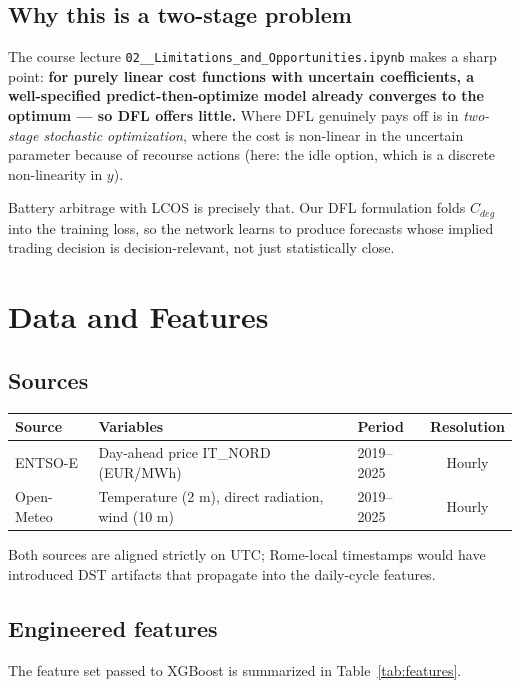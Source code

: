 \documentclass[11pt,a4paper]{article}
\newcommand{\code}[1]{\allowbreak\texttt{\small #1}\allowbreak}
\begin{document}
\subsection{Why this is a two-stage problem}
The course lecture \code{02\_\_Limitations\_and\_Opportunities.ipynb}
makes a sharp point: \textbf{for purely linear cost functions with
uncertain coefficients, a well-specified predict-then-optimize model
already converges to the optimum --- so DFL offers little.} Where DFL
genuinely pays off is in \emph{two-stage stochastic optimization}, where
the cost is non-linear in the uncertain parameter because of recourse
actions (here: the idle option, which is a discrete non-linearity in
$y$).

Battery arbitrage with LCOS is precisely that. Our DFL formulation folds
$C_{deg}$ into the training loss, so the network learns to produce
forecasts whose implied trading decision is decision-relevant, not just
statistically close.


\section{Data and Features}

\subsection{Sources}
\begin{center}
\begin{tabular}{@{}lllc@{}}
\toprule
\textbf{Source} & \textbf{Variables} & \textbf{Period} & \textbf{Resolution} \\
\midrule
ENTSO-E    & Day-ahead price IT\_NORD (EUR/MWh)               & 2019--2025 & Hourly \\
Open-Meteo & Temperature (2 m), direct radiation, wind (10 m) & 2019--2025 & Hourly \\
\bottomrule
\end{tabular}
\end{center}
Both sources are aligned strictly on UTC; Rome-local timestamps would
have introduced DST artifacts that propagate into the daily-cycle
features.

\subsection{Engineered features}
The feature set passed to XGBoost is summarized in
Table~\ref{tab:features}.
\end{document}

